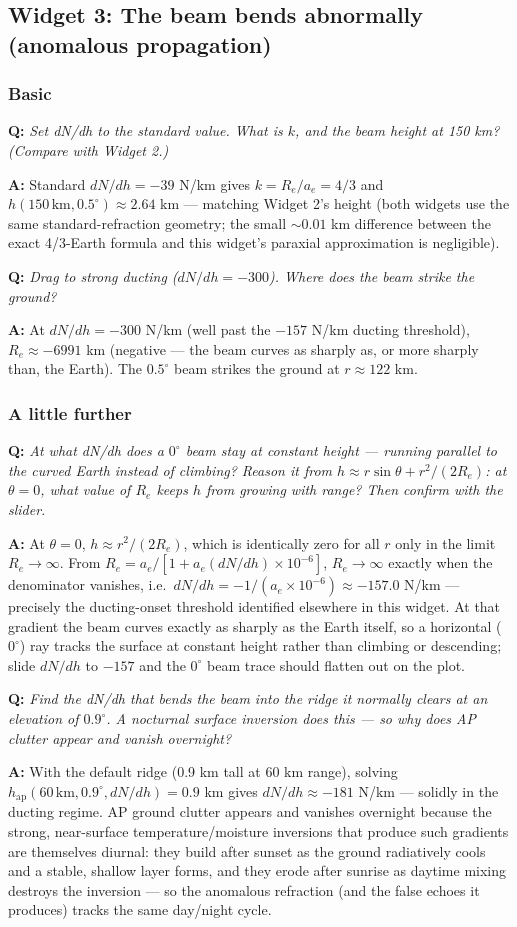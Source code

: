 \documentclass[11pt]{article}
\newenvironment{qa}[1]{\par\noindent\textbf{\color{qgray}Q: }\emph{#1}\par\noindent\textbf{A: }}{\par\vspace{6pt}}
\newcommand{\tier}[1]{\subsubsection*{#1}}
\begin{document}
\subsection{Widget 3: The beam bends abnormally (anomalous propagation)}

\tier{Basic}
\begin{qa}{Set dN/dh to the standard value. What is $k$, and the beam height at 150 km? (Compare with Widget 2.)}
Standard $dN/dh=-39$ N/km gives $k=R_e/a_e=4/3$ and $h(150\,\mathrm{km},0.5^\circ)\approx2.64$ km --- matching Widget 2's height (both widgets use the same standard-refraction geometry; the small $\sim0.01$ km difference between the exact 4/3-Earth formula and this widget's paraxial approximation is negligible).
\end{qa}
\begin{qa}{Drag to strong ducting ($dN/dh=-300$). Where does the beam strike the ground?}
At $dN/dh=-300$ N/km (well past the $-157$ N/km ducting threshold), $R_e\approx-6991$ km (negative --- the beam curves as sharply as, or more sharply than, the Earth). The $0.5^\circ$ beam strikes the ground at $r\approx122$ km.
\end{qa}

\tier{A little further}
\begin{qa}{At what dN/dh does a $0^\circ$ beam stay at constant height --- running parallel to the curved Earth instead of climbing? Reason it from $h\approx r\sin\theta + r^2/(2R_e)$: at $\theta=0$, what value of $R_e$ keeps $h$ from growing with range? Then confirm with the slider.}
At $\theta=0$, $h\approx r^2/(2R_e)$, which is identically zero for all $r$ only in the limit $R_e\to\infty$. From $R_e = a_e/[1+a_e(dN/dh)\times10^{-6}]$, $R_e\to\infty$ exactly when the denominator vanishes, i.e.\ $dN/dh = -1/(a_e\times10^{-6}) \approx -157.0$ N/km --- precisely the ducting-onset threshold identified elsewhere in this widget. At that gradient the beam curves exactly as sharply as the Earth itself, so a horizontal ($0^\circ$) ray tracks the surface at constant height rather than climbing or descending; slide $dN/dh$ to $-157$ and the $0^\circ$ beam trace should flatten out on the plot.
\end{qa}
\begin{qa}{Find the dN/dh that bends the beam into the ridge it normally clears at an elevation of $0.9^\circ$. A nocturnal surface inversion does this --- so why does AP clutter appear and vanish overnight?}
With the default ridge (0.9 km tall at 60 km range), solving $h_{\mathrm{ap}}(60\,\mathrm{km}, 0.9^\circ, dN/dh) = 0.9$ km gives $dN/dh\approx-181$ N/km --- solidly in the ducting regime. AP ground clutter appears and vanishes overnight because the strong, near-surface temperature/moisture inversions that produce such gradients are themselves diurnal: they build after sunset as the ground radiatively cools and a stable, shallow layer forms, and they erode after sunrise as daytime mixing destroys the inversion --- so the anomalous refraction (and the false echoes it produces) tracks the same day/night cycle.
\end{qa}
\end{document}
